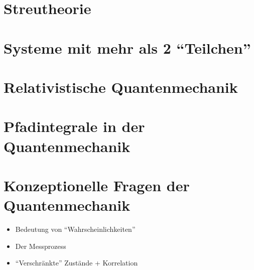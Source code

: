 \documentclass[ngerman, paper=a4, 12pt]{scrartcl}
\begin{document}
	\section{Streutheorie}
	 
	
	
	\section{Systeme mit mehr als 2 ``Teilchen''}
	
	
	 
	
	
	\section{Relativistische Quantenmechanik}
	
	
	
	\section{Pfadintegrale in der Quantenmechanik}
	
	
	
	
	
	
	
	
	
	
	\section{Konzeptionelle Fragen der Quantenmechanik} 
	\begin{itemize}
		\item Bedeutung von ``Wahrscheinlichkeiten''
		\item Der Messprozess
		\item ``Verschränkte'' Zustände + Korrelation
	\end{itemize}
	
	
	
	
	
	
\end{document}
